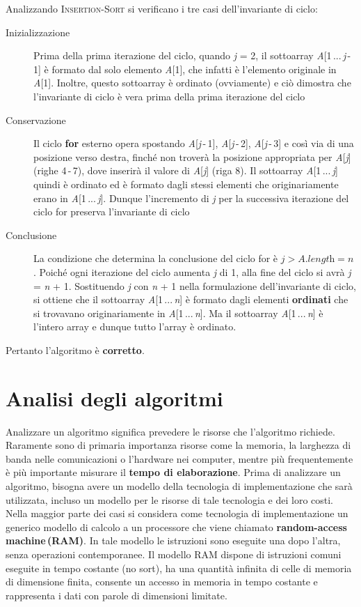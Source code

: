 \documentclass[10pt, a4paper]{report}
\begin{document}
Analizzando \textsc{Insertion-Sort} si verificano i tre casi dell'invariante di ciclo:
\begin{description}
\item[Inizializzazione]Prima della prima iterazione del ciclo, quando \textit{j} = 2, il sottoarray  \textit{A}[1\,...\,\textit{j}\,-\,1] è formato dal solo elemento \textit{A}[1], che infatti è l'elemento originale in \textit{A}[1]. Inoltre, questo sottoarray è ordinato (ovviamente) e ciò dimostra che l'invariante di ciclo è vera prima della prima iterazione del ciclo
\item[Conservazione]Il ciclo \textbf{for} esterno opera spostando \textit{A}[\textit{j}\,-\,1], \textit{A}[\textit{j}\,-\,2], \textit{A}[\textit{j}\,-\,3] e così via di una posizione verso destra, finché non troverà la posizione appropriata per \textit{A}[\textit{j}] (righe 4\,-\,7), dove inserirà il valore di \textit{A}[\textit{j}] (riga 8). Il sottoarray \textit{A}[1\,...\,\textit{j}] quindi è ordinato ed è formato dagli stessi elementi che originariamente erano in \textit{A}[1\,...\,\textit{j}]. Dunque l'incremento di \textit{j} per la successiva iterazione del ciclo for preserva l'invariante di ciclo
\item[Conclusione]La condizione che determina la conclusione del ciclo for è $ \textit{j} > A.\textit{length}  = \textit{n}$. Poiché ogni iterazione del ciclo aumenta \textit{j} di 1, alla fine del ciclo si avrà \textit{j} = \textit{n} + 1. Sostituendo \textit{j} con \textit{n} + 1 nella formulazione dell'invariante di ciclo, si ottiene che il sottoarray \textit{A}[1\,...\,\textit{n}] è formato dagli elementi \textbf{ordinati} che si trovavano originariamente in \textit{A}[1\,...\,\textit{n}]. Ma il sottoarray \textit{A}[1\,...\,\textit{n}] è l'intero array e dunque tutto l'array è ordinato.
\end{description}
Pertanto l'algoritmo è \textbf{corretto}.
\section{Analisi degli algoritmi}
Analizzare un algoritmo significa prevedere le risorse che l'algoritmo richiede. Raramente sono di primaria importanza risorse come la memoria, la larghezza di banda nelle comunicazioni o l'hardware nei computer, mentre più frequentemente è più importante misurare il \textbf{tempo di elaborazione}. Prima di analizzare un algoritmo, bisogna avere un modello della tecnologia di implementazione che sarà utilizzata, incluso un modello per le risorse di tale tecnologia e dei loro costi. Nella maggior parte dei casi si considera come tecnologia di implementazione un generico modello di calcolo a un processore che viene chiamato \textbf{random-access machine\,(RAM)}. In tale modello le istruzioni sono eseguite una dopo l'altra, senza operazioni contemporanee. Il modello RAM dispone di istruzioni comuni eseguite in tempo costante (no sort), ha una quantità infinita di celle di memoria di dimensione finita, consente un accesso in memoria in tempo costante e rappresenta i dati con parole di dimensioni limitate.
\end{document}
